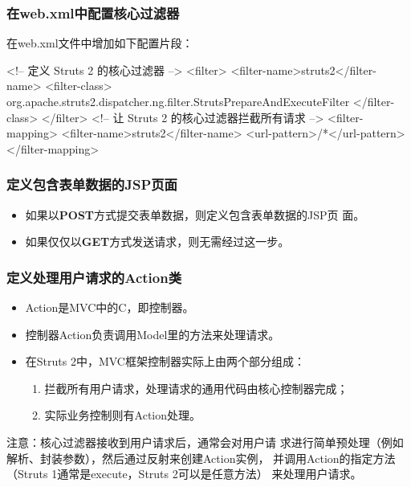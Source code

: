 \begin{frame}[fragile] %
\frametitle{ 在web.xml中配置核心过滤器}

在web.xml文件中增加如下配置片段：

\begin{xmlCode}
<!-- 定义 Struts 2 的核心过滤器 -->
<filter>
  <filter-name>struts2</filter-name>
  <filter-class>
    org.apache.struts2.dispatcher.ng.filter.StrutsPrepareAndExecuteFilter
  </filter-class>
</filter>
<!-- 让 Struts 2 的核心过滤器拦截所有请求 -->
<filter-mapping>
  <filter-name>struts2</filter-name>
  <url-pattern>/*</url-pattern>
</filter-mapping>  
\end{xmlCode}

\end{frame}

\begin{frame}[fragile] %
\frametitle{ 定义包含表单数据的JSP页面}

\begin{itemize}
\item 如果以{\bf\Red POST}方式提交表单数据，则定义包含表单数据的JSP页
  面。
\item 如果仅仅以{\bf\Blue GET}方式发送请求，则无需经过这一步。
\end{itemize}
\end{frame}

\begin{frame}[fragile] %
\frametitle{ 定义处理用户请求的Action类}

\begin{itemize}
\item Action是MVC中的C，即控制器。
\item 控制器Action负责调用Model里的方法来处理请求。
\item 在Struts 2中，MVC框架控制器实际上由两个部分组成：
  \begin{enumerate}\kai
  \item 拦截所有用户请求，处理请求的通用代码由核心控制器完成；
\item 实际业务控制则有Action处理。
\end{enumerate}

\end{itemize}

{\Blue\kai\scriptsize 注意：核心过滤器接收到用户请求后，通常会对用户请
  求进行简单预处理（例如解析、封装参数），然后通过反射来创建Action实例，
  并调用Action的指定方法（Struts 1通常是execute，Struts 2可以是任意方法）
  来处理用户请求。}
\end{frame}

